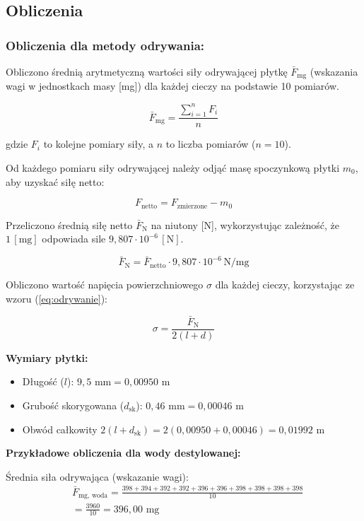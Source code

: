 \documentclass[a4paper,12pt]{article}
\begin{document}
\subsection{Obliczenia}

\subsubsection{Obliczenia dla metody odrywania:}

Obliczono średnią arytmetyczną wartości siły odrywającej płytkę $\bar{F}_{\text{mg}}$ (wskazania wagi w jednostkach masy [mg]) dla każdej cieczy na podstawie 10 pomiarów.

$$
    \bar{F}_{\text{mg}} = \frac{\sum_{i=1}^{n} F_i}{n}
$$

gdzie $F_i$ to kolejne pomiary siły, a $n$ to liczba pomiarów ($n=10$).

Od każdego pomiaru siły odrywającej należy odjąć masę spoczynkową płytki $m_0$, aby uzyskać siłę netto:

$$
    F_{\text{netto}} = F_{\text{zmierzone}} - m_0
$$

Przeliczono średnią siłę netto $\bar{F}_{\text{N}}$ na niutony [N], wykorzystując zależność, że $1 \, [\text{mg}]$ odpowiada sile $9{,}807 \cdot 10^{-6} \, [\text{N}]$.

$$
    \bar{F}_{\text{N}} = \bar{F}_{\text{netto}} \cdot 9{,}807 \cdot 10^{-6} \, \text{N/mg}
$$

Obliczono wartość napięcia powierzchniowego $\sigma$ dla każdej cieczy, korzystając ze wzoru (\ref{eq:odrywanie}):

$$
    \sigma = \frac{\bar{F}_{\text{N}}}{2(l+d)}
$$

\noindent\textbf{Wymiary płytki:}
\begin{itemize}
    \item Długość ($l$): $9{,}5 \text{ mm} = 0{,}00950 \text{ m}$
    \item Grubość skorygowana ($d_{\text{sk}}$): $0{,}46 \text{ mm} = 0{,}00046 \text{ m}$
    \item Obwód całkowity $2(l+d_{\text{sk}}) = 2(0{,}00950 + 0{,}00046) = 0{,}01992 \text{ m}$
\end{itemize}

\noindent\textbf{Przykładowe obliczenia dla wody destylowanej:}

Średnia siła odrywająca (wskazanie wagi):
\begin{align*}
     & \bar{F}_{\text{mg, woda}} = \frac{398+394+392+392+396+396+398+398+398+398}{10} \\
     & = \frac{3960}{10} = 396{,}00 \text{ mg}
\end{align*}
\end{document}
